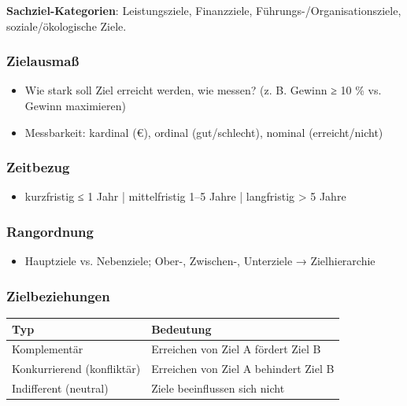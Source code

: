 \documentclass[11pt, a4paper]{article}
\begin{document}
\textbf{Sachziel-Kategorien}: Leistungsziele, Finanzziele, Führungs-/Organisationsziele, soziale/ökologische Ziele.



\subsubsection{Zielausmaß}
\begin{itemize}
  \item Wie stark soll Ziel erreicht werden, wie messen? (z. B. Gewinn ≥ 10 \% vs. Gewinn maximieren)
  \item Messbarkeit: kardinal (€), ordinal (gut/schlecht), nominal (erreicht/nicht)
\end{itemize}


\subsubsection{Zeitbezug}
\begin{itemize}
  \item kurzfristig ≤ 1 Jahr | mittelfristig 1–5 Jahre | langfristig > 5 Jahre
\end{itemize}


\subsubsection{Rangordnung}
\begin{itemize}
  \item Hauptziele vs. Nebenziele; Ober-, Zwischen-, Unterziele → Zielhierarchie
\end{itemize}


\subsubsection{Zielbeziehungen}


{\small
\begin{tabularx}{\linewidth}{XX}
\hline
\rowcolor{tableheadbg}
{\color{white}\textbf{Typ}} & {\color{white}\textbf{Bedeutung}} \\[2pt]
\hline
\endhead
\hline
\endfoot
Komplementär & Erreichen von Ziel A fördert Ziel B \\
Konkurrierend (konfliktär) & Erreichen von Ziel A behindert Ziel B \\
Indifferent (neutral) & Ziele beeinflussen sich nicht \\
\end{tabularx}
}
\end{document}
